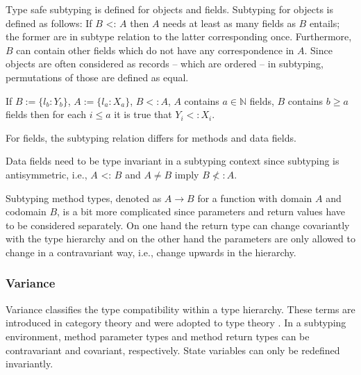 Type safe subtyping is defined for objects and fields. Subtyping for
objects is defined as follows: If $B$ <: $A$ then $A$ needs at least as
many fields as $B$ entails; the former are in subtype relation to the
latter corresponding once. Furthermore, $B$ can contain other fields which
do not have any correspondence in $A$. Since objects are often considered
as records -- which are ordered -- in subtyping, permutations of those
are defined as equal.
\begin{defn}
	\label{def:subtypeObject}
	If $B := \{l_b : Y_b\}$, $A := \{l_a : X_a\}$, $B <: A$, $A$
	contains $a \in \mathbb{N}$ fields, $B$ contains $b \geq a$
	fields then for each $i\leq a$ it is true that $Y_i <: X_i$.
\end{defn}

For fields, the subtyping relation differs for methods and data fields.

Data fields need to be type invariant in a subtyping context since
subtyping is antisymmetric, i.e., $A$ <: $B$ and $A \neq B$ imply $B \nless: A$.

Subtyping method types, denoted as $A \rightarrow B$ for a function with
domain $A$ and codomain $B$, is a bit more complicated since parameters
and return values have to be considered separately. On one hand the return
type can change covariantly with the type hierarchy and on the other hand
the parameters are only allowed to change in a contravariant way, i.e.,
change upwards in the hierarchy.

\begin{defn}
\label{def:methodSubtyping}
	\begin{mathpar}
	\end{mathpar}
\end{defn}

\subsubsection{Variance}
Variance classifies the type compatibility within a type hierarchy. These
terms are introduced in category theory and were adopted to type theory
\cite{pierce_basic_1991}. In a subtyping environment, method parameter types and
method return types can be contravariant and covariant, respectively. State variables
can only be redefined invariantly.

